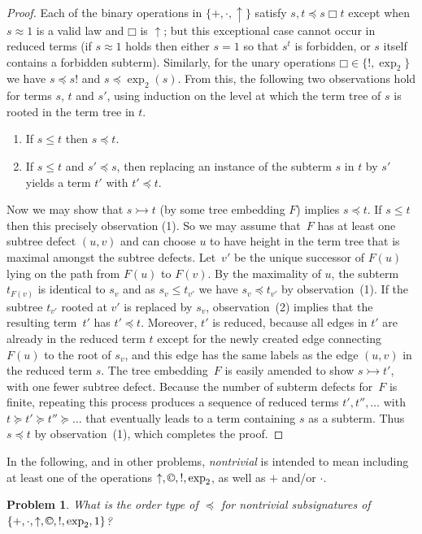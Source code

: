 \documentclass[eqnor,reqno]{amsart}
\theoremstyle{plain}
\newtheorem{problem}[thm]{Problem}
\theoremstyle{definition}
\newcommand{\cc}{\mathbin{\textup{\copyright}}}
\newcommand{\inj}{\rightarrowtail}
\newcommand{\bbox}{\mathbin{\Box}}
\begin{document}
\begin{proof}
Each of the binary operations in $\{+,\cdot,\uparrow\}$ satisfy $s,t\preceq s\bbox t$ except when $s\approx 1$ is a valid law and $\bbox$ is $\uparrow$; but this exceptional case cannot occur in reduced terms (if $s\approx 1$ holds then either $s=1$ so that $s^t$ is forbidden, or $s$ itself contains a forbidden subterm).  
Similarly, for the unary operations $\bbox\in\{!,\exp_2\}$ we have $s\preceq s!$ and $s\preceq \exp_2(s)$.
From this, the following two observations hold for terms $s$, $t$ and $s'$, using induction on the level at which the term tree of $s$ is rooted in the term tree in $t$.
\begin{enumerate}
\item[(1)] If $s\leq t$ then $s\preceq t$.
\item[(2)] If $s\leq t$ and $s'\preceq s$, then replacing an instance of the subterm $s$ in $t$ by $s'$ yields a term $t'$ with $t'\preceq t$.
\end{enumerate} 

Now we may show that $s\inj t$ (by some  tree embedding $F$) implies $s\preceq t$.  
If $s\leq t$ then this precisely observation (1).
So we may assume that~$F$ has at least one subtree defect $(u,v)$ and can choose $u$ to have  height in the term tree that is maximal amongst the subtree defects.
Let~$v'$ be the unique successor of $F(u)$ lying on the path from $F(u)$ to $F(v)$.
By the maximality of $u$, the subterm $t_{F(v)}$ is identical to $s_v$ and as $s_v\leq t_{v'}$ we have   $s_v\preceq t_{v'}$ by observation~(1).  If the subtree $t_{v'}$ rooted at $v'$ is replaced by $s_v$, observation~(2) implies that the resulting term~$t'$ has ${t'}\preceq {t}$.  
Moreover, $t'$ is reduced, because all edges in $t'$ are already in the reduced term $t$ except for the newly created edge connecting $F(u)$ to the root of $s_v$, and this edge has the same labels as the edge $(u,v)$ in the reduced term $s$.
The tree embedding~$F$ is easily amended to show $s\inj t'$, with one fewer subtree defect.
Because the number of subterm defects for~$F$ is finite, repeating this process produces a sequence of reduced terms $t',t'',\dots$ with $t\succeq t'\succeq t''\succeq \dots$ that eventually leads to a term containing $s$ as a subterm.  
Thus ${s}\preceq {t}$ by observation~(1), which completes the proof.
\end{proof}
In the following, and in other problems, \emph{nontrivial} is intended to mean including at least one of the operations $\uparrow,\cc,!,\exp_2$, as well as $+$ and/or $\cdot$.
\begin{problem}\label{prob:ordertype}
What is the order type of $\preceq$ for nontrivial subsignatures of $\{+,\cdot,\uparrow,\cc,!,\exp_2,1\}$?
\end{problem}
\end{document}
